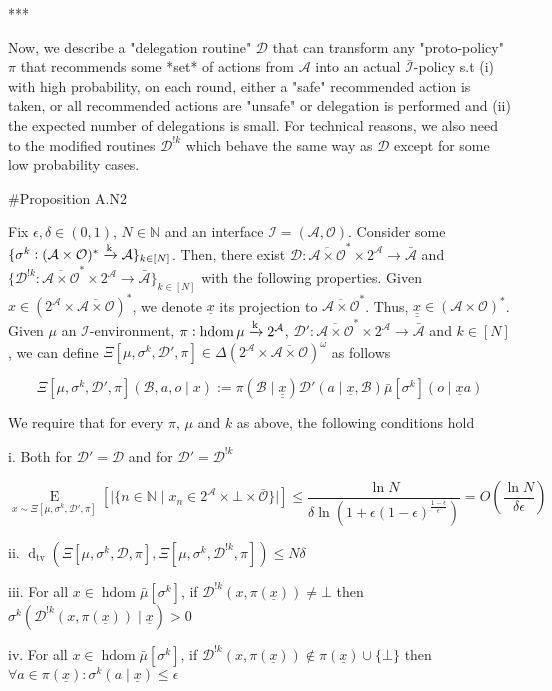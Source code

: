 \documentclass[a4paper]{article}
\newcommand{\E}[1]{\underset{#1}{\operatorname{E}}}
\newcommand{\Dtv}{\operatorname{d}_{\text{tv}}}
\newcommand{\Nats}{\mathbb{N}}
\newcommand{\Abs}[1]{\lvert #1 \rvert}
\newcommand{\M}{\xrightarrow{\textnormal{k}}}
\newcommand{\Ob}{\mathcal{O}}
\newcommand{\A}{\mathcal{A}}
\newcommand{\In}{\mathcal{I}}
\newcommand{\FH}{(\A \times \Ob)^*}
\newcommand{\Ada}{\bar{\A}}
\newcommand{\Adi}{{\bar{\In}}}
\newcommand{\Adao}{\overline{\A \times \Ob}}
\newcommand{\Adfh}{\Adao^*}
\DeclareMathOperator{\HD}{hdom}
\newcommand{\D}{\mathcal{D}}
\newcommand{\B}{\mathcal{B}}
\begin{document}
***

Now, we describe a "delegation routine" $\D$ that can transform any "proto-policy" $\pi$ that recommends some *set* of actions from $\A$ into an actual $\Adi$-policy s.t (i)  with high probability, on each round, either a "safe" recommended action is taken, or all recommended actions are "unsafe" or delegation is performed and (ii) the expected number of delegations is small. For technical reasons, we also need to the modified routines $\D^{!k}$ which behave the same way as $\D$ except for some low probability cases.

\#Proposition A.N2

Fix $\epsilon,\delta \in (0,1)$, $N \in \Nats$ and an interface $\In=(\A,\Ob)$. Consider some $\{\sigma^k: \FH \M \A\}_{k \in [N]}$. Then, there exist $\D: \Adfh \times 2^\A \rightarrow \Ada$ and $\{\D^{!k}: \Adfh \times 2^\A \rightarrow \Ada\}_{k \in [N]}$ with the following properties. Given $x \in \left(2^\A \times \Adao\right)^*$, we denote $\underline{x}$ its projection to $\Adfh$. Thus, $\underline{\underline{x}}\in\FH$.
Given  $\mu$ an $\In$-environment, $\pi: \HD{\mu} \M 2^\A$, $\D': \Adfh \times 2^\A \rightarrow \Ada$ and $k \in [N]$, we can define $\Xi\left[\mu,\sigma^k,\D',\pi\right]\in \Delta\left(2^\A \times \Adao\right)^\omega$ as follows
 
$$\Xi\left[\mu,\sigma^k,\D',\pi\right]\left(\B,a,o \mid x\right):=\pi\left(\B \mid \underline{\underline{x}}\right)\D'\left(a \mid \underline{x},\B\right) \bar{\mu}[\sigma^k]\left(o \mid \underline{x}a\right)$$

We require that for every $\pi$, $\mu$ and $k$ as above, the following conditions hold

i. Both for $\D'=\D$ and for $\D'=\D^{!k}$

$$\E{x \sim\Xi\left[\mu,\sigma^k,\D',\pi\right]}\left[\Abs{\{n \in \Nats \mid x_n \in 2^\A \times \bot \times \bar{\Ob}\}}\right] \leq \frac{\ln N}{\delta \ln\left(1 + \epsilon(1-\epsilon)^{\frac{1-\epsilon}{\epsilon}}\right)}=O\left(\frac{\ln N}{\delta \epsilon}\right)$$

ii. $\Dtv\left(\Xi\left[\mu,\sigma^k,\D,\pi\right],\Xi\left[\mu,\sigma^k,\D^{!k},\pi\right]\right) \leq N\delta$

iii. For all $x \in \HD{\bar{\mu}[\sigma^k]}$, if $\D^{!k}\left(x,\pi\left(\underline{x}\right)\right) \ne \bot$ then $\sigma^k\left(\D^{!k}\left(x,\pi\left(\underline{x}\right)\right) \mid \underline{x}\right) > 0$

iv. For all $x \in \HD{\bar{\mu}[\sigma^k]}$, if $\D^{!k}\left(x,\pi\left(\underline{x}\right)\right) \not\in \pi\left(\underline{x}\right) \cup \{\bot\}$ then $\forall a \in \pi\left(\underline{x}\right): \sigma^k\left(a \mid \underline{x}\right) \leq \epsilon$
\end{document}
